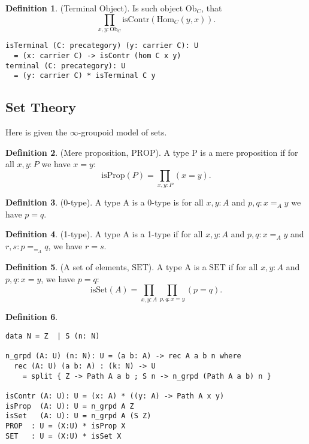 \documentclass{article}
\theoremstyle{definition}
\newtheorem{definition}{Definition}
\begin{document}
\newpage
\begin{definition} (Terminal Object). Is such object $\mathrm{Ob}_C$,
that
$$
    \prod_{x,y:\mathrm{Ob}_C} \mathrm{isContr} (\mathrm{Hom}_C(y,x)).
$$
\begin{lstlisting}
isTerminal (C: precategory) (y: carrier C): U
  = (x: carrier C) -> isContr (hom C x y)
terminal (C: precategory): U
  = (y: carrier C) * isTerminal C y
\end{lstlisting}
\end{definition}


\subsection*{Set Theory}

Here is given the $\infty$-groupoid model of sets.

\begin{definition} (Mere proposition, $\mathrm{PROP}$).
A type P is a mere proposition if for all $x,y: P$ we have $x=y$:
$$
    \mathrm{isProp}(P) = \prod_{x,y:P}(x=y).
$$
\end{definition}

\begin{definition} (0-type).
A type A is a 0-type is for all $x,y: A$ and $p,q: x =_A y$ we have $p = q$.
\end{definition}

\begin{definition} (1-type).
A type A is a 1-type if for all $x,y: A$ and $p,q: x =_A y$ and $r,s:p =_{=_A} q$, we have $r = s$.
\end{definition}

\begin{definition} (A set of elements, $\mathrm{SET}$).
A type A is a $\mathrm{SET}$ if for all $x,y: A$ and $p,q: x = y$, we have $p = q$:
$$
    \mathrm{isSet}(A) = \prod_{x,y:A}\prod_{p,q:x=y}(p=q).
$$
\end{definition}

\begin{definition}
\begin{lstlisting}
data N = Z  | S (n: N)

n_grpd (A: U) (n: N): U = (a b: A) -> rec A a b n where
  rec (A: U) (a b: A) : (k: N) -> U
    = split { Z -> Path A a b ; S n -> n_grpd (Path A a b) n }

isContr (A: U): U = (x: A) * ((y: A) -> Path A x y)
isProp  (A: U): U = n_grpd A Z
isSet   (A: U): U = n_grpd A (S Z)
PROP  : U = (X:U) * isProp X
SET   : U = (X:U) * isSet X
\end{lstlisting}
\end{definition}
\end{document}
